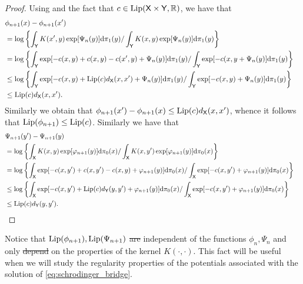 \documentclass[11pt,a4paper]{article}
\providecommand{\DIFaddtex}[1]{{\protect\color{blue}\uwave{#1}}} %
\providecommand{\DIFdeltex}[1]{{\protect\color{red}\sout{#1}}}                      %
\providecommand{\DIFaddbegin}{} %
\providecommand{\DIFaddend}{} %
\providecommand{\DIFdelbegin}{} %
\providecommand{\DIFdelend}{} %
\providecommand{\DIFadd}[1]{\texorpdfstring{\DIFaddtex{#1}}{#1}} %
\providecommand{\DIFdel}[1]{\texorpdfstring{\DIFdeltex{#1}}{}} %
\begin{document}
\begin{proof}
  Using  and the fact that 
  $c \in \operatorname{Lip}(\mathsf{X} \times \mathsf{Y}, \mathbb{R})$, 
  we have that 
  \begin{align}
  \lefteqn{\phi_{n+1}(x)-\phi_{n+1}(x')}\\
  &=\log\left\{  \int_{\msy} K(x',y) \exp[\Psi_n(y)] \rmd \pi_1(y)/ \int_{\msy} K(x,y) \exp[\Psi_n(y)] \rmd \pi_1(y) \right\}\\
  &= \log \left\{ 
  \int_{\msy} \exp[-c(x,y) + c(x,y)-c(x',y)+\Psi_n(y)] \rmd \pi_1(y)/ \int_{\msy} \exp[-c(x,y+\Psi_n(y)] \rmd \pi_1(y)\right\} \\
  &\leq \log \left\{ 
  \int_{\msy} \exp[-c(x,y) + \Lip(c)\ddx(x,x')+\Psi_n(y)] \rmd \pi_1(y)/ \int_{\msy} \exp[-c(x,y)+\Psi_n(y)] \rmd \pi_1(y)\right\} \\ 
  &\leq \Lip(c)\ddx (x,x').
  \end{align}
  Similarly we obtain that $\phi_{n+1}(x')-\phi_{n+1}(x)\leq \operatorname{Lip}(c)d_{\mathsf{X}} (x,x')$, whence it follows that $\operatorname{Lip}(\phi_{n+1})\leq \operatorname{Lip}(c)$.
  Similarly we have that 
  \begin{align}
     \lefteqn{\Psi_{n+1}(y')-\Psi_{n+1}(y)}\\
     &= \log \left \{ \int_{\msx} K(x,y) \exp[\varphi_{n+1}(y)] \rmd \pi_0(x) /
     \int_{\msx} K(x,y') \exp[\varphi_{n+1}(y)] \rmd \pi_0(x)
     \right\}\\
     &= \log \left \{ \int_{\msx}  \exp[-c(x,y')+c(x,y')-c(x,y)+\varphi_{n+1}(y)] \rmd \pi_0(x) /
     \int_{\msx} \exp[-c(x,y')+\varphi_{n+1}(y)] \rmd \pi_0(x)
     \right\}\\
     &\leq \log \left \{ \int_{\msx}  \exp[-c(x,y')+\Lip(c)\ddy(y,y')+\varphi_{n+1}(y)] \rmd \pi_0(x) /
     \int_{\msx} \exp[-c(x,y')+\varphi_{n+1}(y)] \rmd \pi_0(x)
     \right\}\\
     &\leq \Lip(c) \ddy(y,y').\qedhere
  \end{align}
\end{proof}
\begin{remark}\label{rem:lipconstant}
Notice that $\operatorname{Lip}(\phi_{n+1}), \operatorname{Lip}(\Psi_{n+1})$ \DIFdelbegin \DIFdel{are }\DIFdelend \DIFaddbegin \DIFadd{is }\DIFaddend independent of the functions $\phi_n, \Psi_n$ and only \DIFdelbegin \DIFdel{depend }\DIFdelend \DIFaddbegin \DIFadd{depends }\DIFaddend on the properties of the kernel $K(\cdot, \cdot)$. This fact will be useful when we will study the regularity properties of the potentials associated with the solution of \eqref{eq:schrodinger_bridge}. 
\end{remark}
\end{document}
